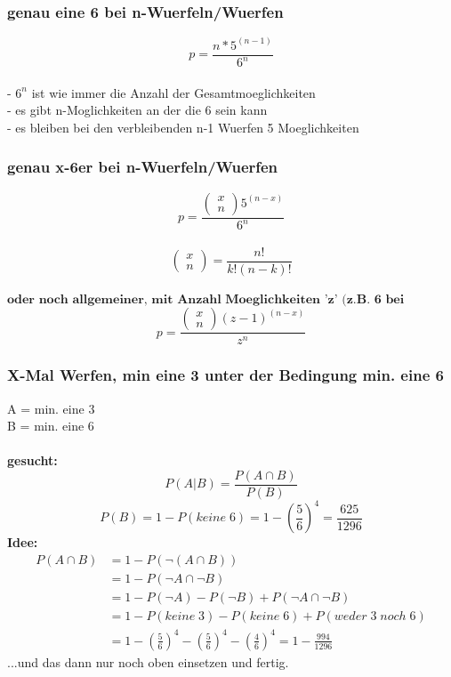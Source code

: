 \documentclass{article}
\begin{document}
\subsubsection{genau eine 6 bei n-Wuerfeln/Wuerfen}
\[ p= \frac{n*5^{(n-1)}}{6^n}\]\\
- $6^n $ ist wie immer die Anzahl der Gesamtmoeglichkeiten \\
- es gibt n-Moglichkeiten an der die 6 sein kann \\
- es bleiben bei den verbleibenden n-1 Wuerfen 5 Moeglichkeiten
\subsubsection{genau x-6er bei n-Wuerfeln/Wuerfen}
\[ p= \frac{\begin{pmatrix}
			x\\n
\end{pmatrix}5^{(n-x)}}{6^n}\]\\
\[\begin{pmatrix}
		x\\n
	\end{pmatrix}= \frac{n!}{k!(n-k)!}
\]\\
$\textbf{oder noch allgemeiner, mit Anzahl Moeglichkeiten 'z' (z.B. 6 bei Wuerfel):}$\[
	p= \frac{\begin{pmatrix}
			x\\n
	\end{pmatrix}(z-1)^{(n-x)}}{z^n}
\]
\subsubsection{X-Mal Werfen, min eine 3 unter der Bedingung min. eine 6}
	A = min. eine 3 \\
	B = min. eine 6 \\\\
	\textbf{gesucht:} \[P(A|B) = \frac{P(A\cap B)}{P(B)} \]
	\[P(B) = 1-P(keine\;6) = 1-\left(\frac{5}{6}\right)^4 = \frac{625}{1296}\]
	\textbf{Idee:}
		\begin{align*}
			P(A\cap B) 	&= 1-P(\neg (A\cap B))\\
						&= 1-P(\neg A \cap \neg B)\\
						&= 1-P(\neg A) - P(\neg B) + P(\neg A \cap \neg B)\\
						&= 1-P(keine\;3)-P(keine\;6)+P(weder\;3\;noch\;6)\\
						&= 1-\left( \frac{5}{6}\right)^4-\left( \frac{5}{6}\right)^4-\left( \frac{4}{6}\right)^4 = 1- \frac{994}{1296}
		\end{align*}	
...und das dann nur noch oben einsetzen und fertig.
\end{document}
